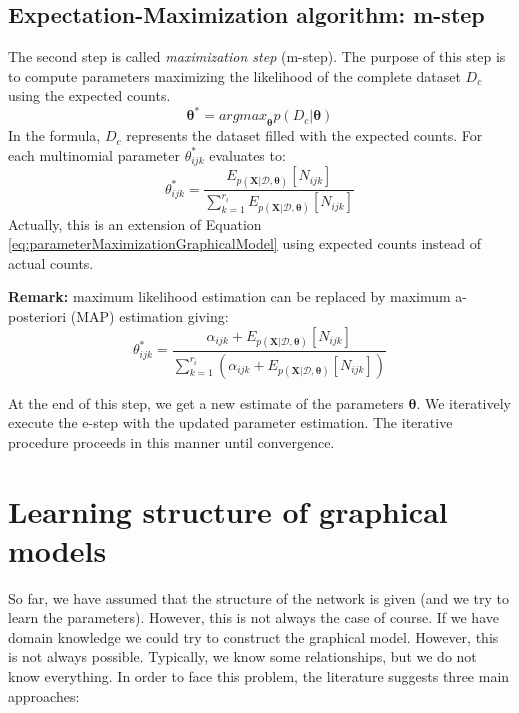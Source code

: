 \subsection{Expectation-Maximization algorithm: m-step}
The second step is called \textit{maximization step} (m-step). The purpose of
this step is to compute parameters maximizing the likelihood of the complete
dataset $D_{c}$ using the expected counts.
\begin{equation}
	\pmb{\theta}^{*} = \mathit{argmax}_{\pmb{\theta}}p(D_{c}|\pmb{\theta})
\end{equation}
In the formula, $D_{c}$ represents the dataset filled with the expected counts. For
each multinomial parameter $\theta^{*}_{ijk}$ evaluates to:
\begin{equation}
	\theta^{*}_{ijk}= \frac{E_{p(\pmb{X}|\mathcal{D}, \pmb{\theta})}[N_{ijk}]}{\sum_{k=1}^{r_i}E_{p(\pmb{X}|\mathcal{D},
	\pmb{\theta})}[N_{ijk}]}
\end{equation}
Actually, this is an extension of Equation \ref{eq:parameterMaximizationGraphicalModel}
using expected counts instead of actual counts.
\newline

\textbf{Remark:} maximum likelihood estimation can be replaced by maximum a-posteriori
(MAP) estimation giving:
\begin{equation}
	\theta^{*}_{ijk}= \frac{\alpha_{ijk}+ E_{p(\pmb{X}|\mathcal{D}, \pmb{\theta})}[N_{ijk}]}{\sum_{k=1}^{r_i}(\alpha_{ijk}+E_{p(\pmb{X}|\mathcal{D},
	\pmb{\theta})}[N_{ijk}])}
\end{equation}

At the end of this step, we get a new estimate of the parameters $\pmb{\theta}$.
We iteratively execute the e-step with the updated parameter estimation. The iterative
procedure proceeds in this manner until convergence.

\section{Learning structure of graphical models}
So far, we have assumed that the structure of the network is given (and we try to
learn the parameters). However, this is not always the case of course. If we have
domain knowledge we could try to construct the graphical model. However, this is
not always possible. Typically, we know some relationships, but we do not know
everything. In order to face this problem, the literature suggests three main
approaches:

